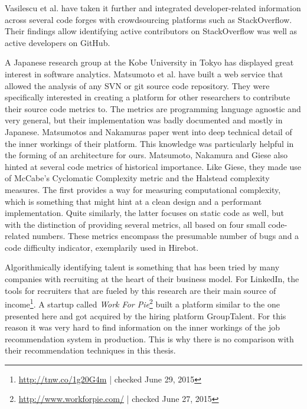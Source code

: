 Vasilescu et al.\@\cite{vfs:2012} have taken it further and integrated developer-related information across several code forges with crowdsourcing platforms such as StackOverflow.
Their findings allow identifying active contributors on StackOverflow was well as active developers on GitHub.
\newline

A Japanese research group at the Kobe University in Tokyo has displayed great interest in software analytics. Matsumoto et al.\@\cite{mn:2011} have built a web service that allowed the analysis of any SVN or git source code repository. They were specifically interested in creating a platform for other researchers to contribute their source code metrics to. The metrics are programming language agnostic and very general, but their implementation was badly documented and mostly in Japanese. Matsumotos and Nakamuras paper went into deep technical detail of the inner workings of their platform. This knowledge was particularly helpful in the forming of an architecture for ours. Matsumoto, Nakamura and Giese also hinted at several code metrics of historical importance. Like Giese\cite{pg:2014}, they made use of McCabe's Cyclomatic Complexity metric\cite{mc:1976} and the Halstead complexity measures\cite{h:1977}. The first provides a way for measuring computational complexity, which is something that might hint at a clean design and a performant implementation. Quite similarly, the latter focuses on static code as well, but with the distinction of providing several metrics, all based on four small code-related numbers. These metrics encompass the presumable number of bugs and a code difficulty indicator, exemplarily used in Hirebot.
\newline

Algorithmically identifying talent is something that has been tried by many companies with recruiting at the heart of their business model. For LinkedIn, the tools for recruiters that are fueled by this research are their main source of income\footnote{\url{http://tnw.co/1g20G4m} | checked June 29, 2015}. A startup called \textit{Work For Pie}\footnote{\url{http://www.workforpie.com/} | checked June 27, 2015} built a platform similar to the one presented here and got acquired by the hiring platform GroupTalent. For this reason it was very hard to find information on the inner workings of the job recommendation system in production. This is why there is no comparison with their recommendation techniques in this thesis.

